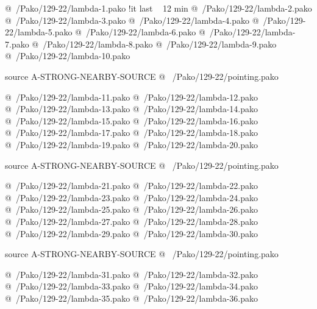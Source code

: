 @~/Pako/129-22/lambda-1.pako        !it last ~ 12 min 
@~/Pako/129-22/lambda-2.pako   
@~/Pako/129-22/lambda-3.pako
@~/Pako/129-22/lambda-4.pako
@~/Pako/129-22/lambda-5.pako
@~/Pako/129-22/lambda-6.pako
@~/Pako/129-22/lambda-7.pako
@~/Pako/129-22/lambda-8.pako
@~/Pako/129-22/lambda-9.pako
@~/Pako/129-22/lambda-10.pako

source A-STRONG-NEARBY-SOURCE
@ ~/Pako/129-22/pointing.pako

@~/Pako/129-22/lambda-11.pako
@~/Pako/129-22/lambda-12.pako
@~/Pako/129-22/lambda-13.pako
@~/Pako/129-22/lambda-14.pako
@~/Pako/129-22/lambda-15.pako
@~/Pako/129-22/lambda-16.pako
@~/Pako/129-22/lambda-17.pako
@~/Pako/129-22/lambda-18.pako
@~/Pako/129-22/lambda-19.pako
@~/Pako/129-22/lambda-20.pako

source A-STRONG-NEARBY-SOURCE
@ ~/Pako/129-22/pointing.pako

@~/Pako/129-22/lambda-21.pako
@~/Pako/129-22/lambda-22.pako
@~/Pako/129-22/lambda-23.pako
@~/Pako/129-22/lambda-24.pako
@~/Pako/129-22/lambda-25.pako
@~/Pako/129-22/lambda-26.pako
@~/Pako/129-22/lambda-27.pako
@~/Pako/129-22/lambda-28.pako
@~/Pako/129-22/lambda-29.pako
@~/Pako/129-22/lambda-30.pako

source A-STRONG-NEARBY-SOURCE
@ ~/Pako/129-22/pointing.pako

@~/Pako/129-22/lambda-31.pako
@~/Pako/129-22/lambda-32.pako
@~/Pako/129-22/lambda-33.pako
@~/Pako/129-22/lambda-34.pako
@~/Pako/129-22/lambda-35.pako
@~/Pako/129-22/lambda-36.pako


